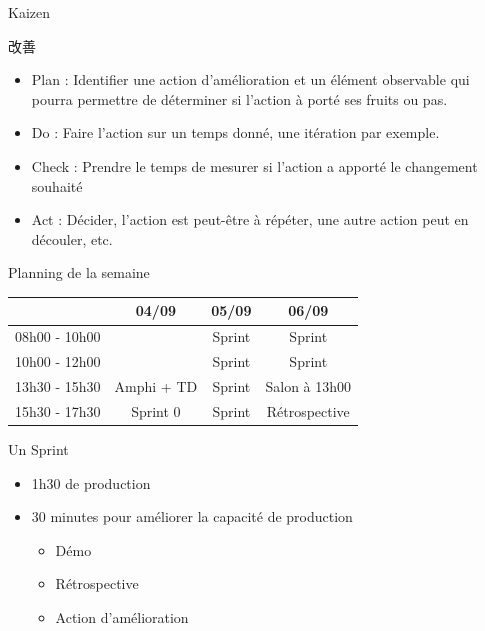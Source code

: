 \documentclass{beamer}
\begin{document}
\begin{frame}{Kaizen 
    {\begin{CJK*}{UTF8}{mj} 改善 \end{CJK*}}
  }
  
  \begin{itemize}
    \item \alert{Plan} : Identifier une action d'amélioration et un élément observable qui pourra permettre de déterminer si l'action à porté ses fruits ou pas.
    \item \alert{Do} : Faire l'action sur un temps donné, une itération par exemple.
    \item \alert{Check} : Prendre le temps de mesurer si l'action a apporté le changement souhaité
    \item \alert{Act} : Décider, l'action est peut-être à répéter, une autre action peut en découler, etc.
  \end{itemize}

\end{frame}


\begin{frame}{Planning de la semaine}{}
  {
    \center
    \begin{tabular}{l | g | g | g  }
      & \textbf{04/09} & \textbf{05/09} & \textbf{06/09} \\
      \hline
      08h00 - 10h00 &          & Sprint & Sprint \\
      \hline
      10h00 - 12h00 &          & Sprint & Sprint \\
      \hline
      13h30 - 15h30 & Amphi + TD & Sprint & Salon à 13h00 \\
      \hline
      15h30 - 17h30 & Sprint 0 & Sprint & Rétrospective \\
      \hline
    \end{tabular}
  }

\end{frame}

\begin{frame}{Un Sprint}
  \begin{itemize}
    \item 1h30 de production
    \item 30 minutes pour améliorer la capacité de production
    \begin{itemize}
      \item Démo 
      \item Rétrospective 
      \item Action d'amélioration
    \end{itemize}
  \end{itemize}
\end{frame}
\end{document}
